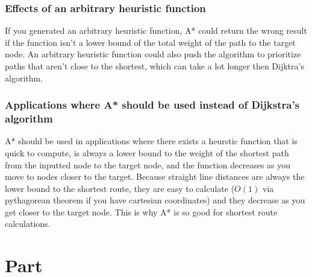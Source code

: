 \documentclass[letterpaper]{article}
\theoremstyle{plain}
\theoremstyle{definition}
\theoremstyle{remark}
\begin{document}
\subsubsection*{Effects of an arbitrary heuristic function}
If you generated an arbitrary heuristic function, A* could return the wrong result if the function isn't a lower bound of the total weight of the path to the target node. An arbitrary heuristic function could also push the algorithm to prioritize paths that aren't close to the shortest, which can take a lot longer then Dijktra's algorithm.

\subsubsection*{Applications where A* should be used instead of Dijkstra’s algorithm}
A* should be used in applications where there exists a heurstic function that is quick to compute, is always a lower bound to the weight of the shortest path from the inputted node to the target node, and the function decreases as you move to nodes closer to the target. Because straight line distances are always the lower bound to the shortest route, they are easy to calculate ($O(1)$ via pythagorean theorem if you have cartesian coordinates) and they decrease as you get closer to the target node. This is why A* is so good for shortest route calculations.


\section*{Part \thesection}
\end{document}
